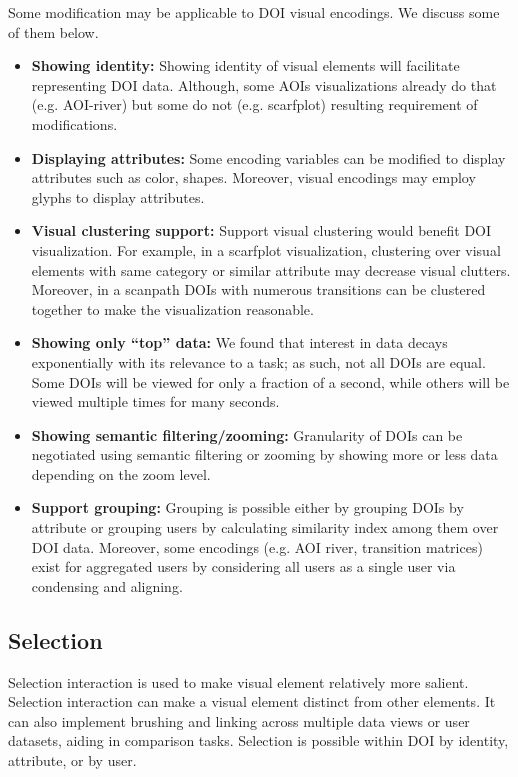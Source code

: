 Some modification may be applicable to DOI visual encodings. We discuss some of them below. 
\begin{itemize}
	\item \textbf{Showing identity:} Showing identity of visual elements will facilitate representing DOI data. Although, some AOIs visualizations already do that (e.g. AOI-river) but some do not (e.g. scarfplot) resulting requirement of modifications.
	\item \textbf{Displaying attributes:} Some encoding variables can be modified to display attributes such as color, shapes. Moreover, visual encodings may employ glyphs to display attributes.
	\item \textbf{Visual clustering support:} Support visual clustering would benefit DOI visualization. For example, in a scarfplot visualization, clustering over visual elements with same category or similar attribute may decrease visual clutters. Moreover, in a scanpath DOIs with numerous transitions can be clustered together to make the visualization reasonable. 
	\item \textbf{Showing only ``top'' data:} We found that interest in data decays exponentially with its relevance to a task; as such, not all DOIs are equal. Some DOIs will be viewed for only a fraction of a second, while others will be viewed multiple times for many seconds. 
	\item \textbf{Showing semantic filtering/zooming:} Granularity of DOIs can be negotiated using semantic filtering or zooming by showing more or less data depending on the zoom level.
	\item \textbf{Support grouping:} Grouping is possible either by grouping DOIs by attribute or grouping users by calculating similarity index among them over DOI data. Moreover, some encodings (e.g. AOI river, transition matrices) exist for aggregated users by considering all users as a single user via condensing and aligning. 
\end{itemize}
\subsection{Selection}
Selection interaction is used to make visual element relatively more salient. Selection interaction can make a visual element distinct from other elements. It can also implement brushing and linking across multiple data views or user datasets, aiding in comparison tasks. 
Selection is possible within DOI by identity, attribute, or by user.
	
